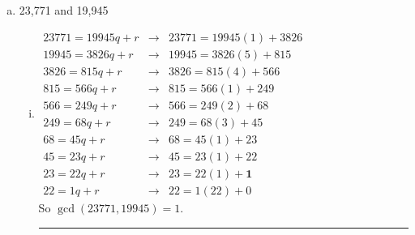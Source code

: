 \documentclass{article}
\begin{document}
\begin{description}
\begin{enumerate}[(a)]
		\item 23,771 and 19,945
			\begin{enumerate}[(i)]
					\item
					$\begin{array}{ccc}
					23771=19945q+r&\to  &  23771=19945(1)+3826\\ 
					19945=3826q+r&\to  &  19945=3826(5)+815\\ 
					3826=815q+r&  \to&  3826=815(4)+566\\ 
					815=566q+r&  \to&  815=566(1)+249\\ 
					566=249q+r& \to &  566=249(2)+68\\ 
					249=68q+r&\to  &  249=68(3)+45\\ 
					68=45q+r& \to &  68=45(1)+23\\ 
					45=23q+r&  \to& 45=23(1)+22\\
					23=22q+r&	\to&	23=22(1)+\mathbf{1}\\
					22=1q+r	&	\to&	22=1(22)+0
					\end{array} $  \\ So $\gcd{(23771,19945)}=1$.\\ \noindent\rule{10cm}{0.4pt}
					

\end{enumerate}
\end{enumerate}
\end{description}
\end{document}

